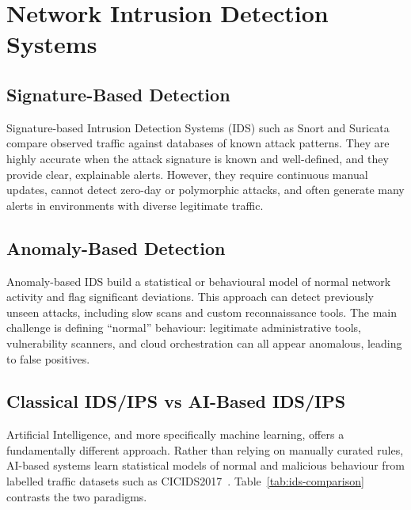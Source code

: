 \section{Network Intrusion Detection Systems}\label{sec:ids}

\subsection{Signature-Based Detection}

Signature-based Intrusion Detection Systems (IDS) such as Snort and Suricata compare observed traffic against databases of known attack patterns. They are highly accurate when the attack signature is known and well-defined, and they provide clear, explainable alerts. However, they require continuous manual updates, cannot detect zero-day or polymorphic attacks, and often generate many alerts in environments with diverse legitimate traffic.

\subsection{Anomaly-Based Detection}

Anomaly-based IDS build a statistical or behavioural model of normal network activity and flag significant deviations. This approach can detect previously unseen attacks, including slow scans and custom reconnaissance tools. The main challenge is defining ``normal'' behaviour: legitimate administrative tools, vulnerability scanners, and cloud orchestration can all appear anomalous, leading to false positives.

\subsection{Classical IDS/IPS vs AI-Based IDS/IPS}

Artificial Intelligence, and more specifically machine learning, offers a fundamentally different approach. Rather than relying on manually curated rules, AI-based systems learn statistical models of normal and malicious behaviour from labelled traffic datasets such as CICIDS2017~\cite{cicids2017}. Table~\ref{tab:ids-comparison} contrasts the two paradigms.

